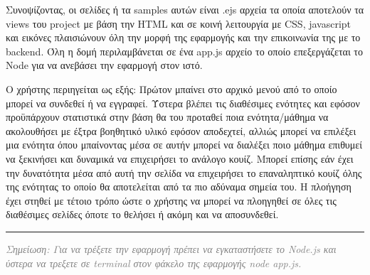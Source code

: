 \documentclass[12pt]{article}
\newcommand{\en}[1]{\foreignlanguage{english}{#1}}
\begin{document}
\par
Συνοψίζοντας, οι σελίδες ή τα \en{samples} αυτών είναι \en{.ejs} αρχεία τα οποία αποτελούν τα \en{views} του \en{project} με βάση την \en{HTML} και σε κοινή λειτουργία με \en{CSS}, \en{javascript} και εικόνες πλαισιώνουν όλη την μορφή της εφαρμογής και την επικοινωνία της με το \en{backend}. Όλη η δομή περιλαμβάνεται σε ένα \en{app.js} αρχείο το οποίο επεξεργάζεται το \en{Node} για να ανεβάσει την εφαρμογή στον ιστό.
\\
\par
Ο χρήστης περιηγείται ως εξής: Πρώτον μπαίνει στο αρχικό μενού από το οποίο μπορεί να συνδεθεί ή να εγγραφεί. Ύστερα βλέπει τις διαθέσιμες ενότητες και εφόσον προϋπάρχουν στατιστικά στην βάση θα του προταθεί ποια ενότητα/μάθημα να ακολουθήσει με έξτρα βοηθητικό υλικό εφόσον αποδεχτεί, αλλιώς μπορεί να επιλέξει μια ενότητα όπου μπαίνοντας μέσα σε αυτήν μπορεί να διαλέξει ποιο μάθημα επιθυμεί να ξεκινήσει και δυναμικά να επιχειρήσει το ανάλογο κουίζ. Μπορεί επίσης εάν έχει την δυνατότητα μέσα από αυτή την σελίδα να επιχειρήσει το επαναληπτικό κουίζ όλης της ενότητας το οποίο θα αποτελείται από τα πιο αδύναμα σημεία του. Η πλοήγηση έχει στηθεί με τέτοιο τρόπο ώστε ο χρήστης να μπορεί να πλοηγηθεί σε όλες τις διαθέσιμες σελίδες όποτε το θελήσει ή ακόμη και να αποσυνδεθεί.
\\
\noindent\rule{\textwidth}{0.4pt}
\textcolor{gray}{\textit{Σημείωση: Για να τρέξετε την εφαρμογή πρέπει να εγκαταστήσετε το \en{Node.js} και ύστερα να τρεξετε σε \en{terminal} στον φάκελο της εφαρμογής \en{node app.js.}}}
\end{document}

